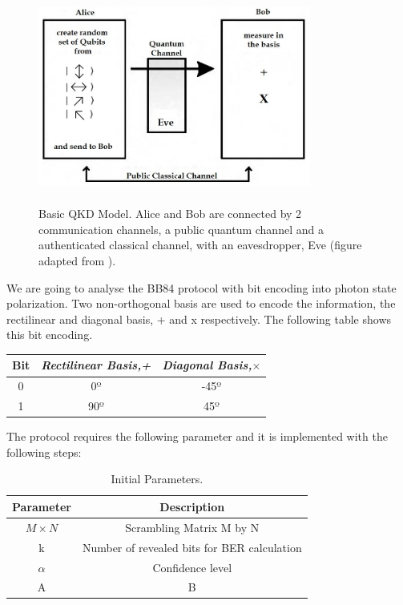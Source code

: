 \begin{refsection}
\begin{figure}[H]
	\centering
	\includegraphics[width=0.8\textwidth,height=7cm]{./sdf/bb84_with_discrete_variables/figures/QKD_Model.png}
	\caption{Basic QKD Model. Alice and Bob are connected by 2 communication channels, a public quantum channel and a authenticated classical channel, with an eavesdropper, Eve (figure adapted from \cite{Gerry05}).}\label{fig:qkd model}
\end{figure}

We are going to analyse the BB84 protocol with bit encoding into photon state polarization. Two non-orthogonal basis are used to encode the information, the rectilinear and diagonal basis, + and x respectively. The following table shows this bit encoding.
\begin{table}[H]
	\centering
	\begin{tabular}{c|c|c}
		 Bit &  \textit{Rectilinear Basis,+} & \textit{Diagonal Basis,$\times$}\\ \hline
		0 &  0$º$ & -45$º$ \\
		1 & 90$º$ & 45$º$\\
	\end{tabular}
\end{table}

The protocol requires the following parameter and it is implemented with the following steps:

\begin{table}[hbt]
	\centering
	\caption{Initial Parameters.}
	\label{tb:param}
	\begin{tabular}{|c|c|}
		\hline
		\textbf{Parameter}  & \textbf{Description} 	   \\ \hline
			$M \times N$    & Scrambling Matrix M by N \\ \hline
			k				& Number of revealed bits for BER calculation \\ \hline
			$\alpha$        & Confidence level 	       \\ \hline
			    A    & B                \\ \hline
	\end{tabular}
\end{table}


\end{refsection}

